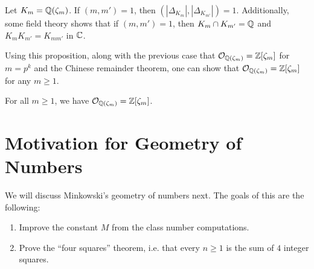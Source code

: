 \begin{remark}
  Let $K_m = \mathbb{Q}(\zeta_m)$. If $(m, m') = 1$, then
  $(|\Delta_{K_m}|, |\Delta_{K_{m'}}|) = 1$.
  Additionally, some field theory shows that
  if $(m, m') = 1$,
  then $K_m \cap K_{m'} = \mathbb{Q}$ and
  $K_m K_{m'} = K_{mm'}$ in $\mathbb{C}$.

  Using this proposition, along with the previous
  case that $\mathcal{O}_{\mathbb{Q}(\zeta_m)} = \mathbb{Z}[\zeta_m]$ for
  $m = p^k$ and the Chinese
  remainder theorem,
  one can show that $\mathcal{O}_{\mathbb{Q}(\zeta_m)} = \mathbb{Z}[\zeta_m]$
  for any $m \ge 1$.
\end{remark}

\begin{corollary}
  For all $m \ge 1$, we have
  $\mathcal{O}_{\mathbb{Q}(\zeta_m)} = \mathbb{Z}[\zeta_m]$.
\end{corollary}

\section{Motivation for Geometry of Numbers}

\begin{remark}
  We will discuss Minkowski's geometry of numbers next.
  The goals of this are the following:
  \begin{enumerate}
    \item Improve the constant $M$ from the class
      number computations.
    \item Prove the ``four squares'' theorem, i.e.
      that every $n \ge 1$ is the sum of $4$ integer
      squares.
  \end{enumerate}
\end{remark}
